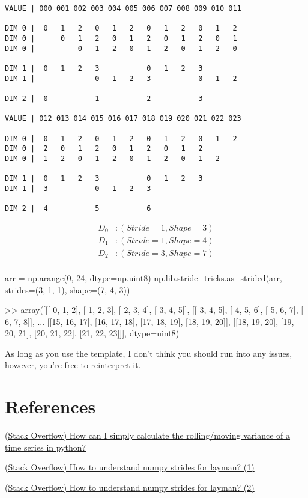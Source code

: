 \documentclass[oneside, 12pt]{report}
\begin{document}
\begin{verbatim}
VALUE | 000 001 002 003 004 005 006 007 008 009 010 011 

DIM 0 |  0   1   2   0   1   2   0   1   2   0   1   2
DIM 0 |      0   1   2   0   1   2   0   1   2   0   1   
DIM 0 |          0   1   2   0   1   2   0   1   2   0  

DIM 1 |  0   1   2   3           0   1   2   3 
DIM 1 |              0   1   2   3           0   1   2  

DIM 2 |  0           1           2           3                    
-------------------------------------------------------
VALUE | 012 013 014 015 016 017 018 019 020 021 022 023 

DIM 0 |  0   1   2   0   1   2   0   1   2   0   1   2
DIM 0 |  2   0   1   2   0   1   2   0   1   2
DIM 0 |  1   2   0   1   2   0   1   2   0   1   2

DIM 1 |  0   1   2   3           0   1   2   3 
DIM 1 |  3           0   1   2   3

DIM 2 |  4           5           6                                
\end{verbatim}

\begin{align*}
D_0&:(Stride=1, Shape=3)\\
D_1&:(Stride=1, Shape=4)\\
D_2&:(Stride=3, Shape=7)\\
\end{align*}

\begin{python}
arr = np.arange(0, 24, dtype=np.uint8)
np.lib.stride_tricks.as_strided(arr, strides=(3, 1, 1), shape=(7, 4, 3))

>> array([[[ 0,  1,  2],
           [ 1,  2,  3],
           [ 2,  3,  4],
           [ 3,  4,  5]],
          [[ 3,  4,  5],
           [ 4,  5,  6],
           [ 5,  6,  7],
           [ 6,  7,  8]], 
           ...
          [[15, 16, 17],
           [16, 17, 18],
           [17, 18, 19],
           [18, 19, 20]],
          [[18, 19, 20],
           [19, 20, 21],
           [20, 21, 22],
           [21, 22, 23]]], dtype=uint8)
\end{python}

As long as you use the template, I don't think you should run into any issues, however, you're free to reinterpret it.

\section{References}

\href{https://stackoverflow.com/a/59322185}{(Stack Overflow) How can I simply calculate the rolling/moving variance of a time series in python?}

\href{https://stackoverflow.com/a/53099870}{(Stack Overflow) How to understand numpy strides for layman? (1)}

\href{https://stackoverflow.com/a/53224165}{(Stack Overflow) How to understand numpy strides for layman? (2)}
\end{document}
